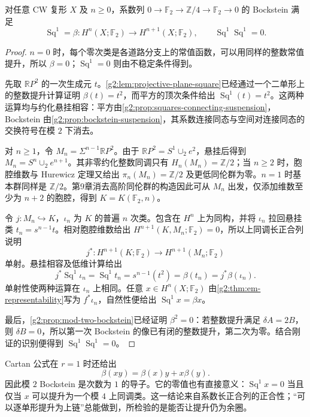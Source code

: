 \begin{proposition}\label{g2:prop:sq-one-bockstein}
	对任意 CW 复形 \(X\) 及 \(n\ge0\)，系数列 \(0\to\mathbb F_2\to\mathbb Z/4\to\mathbb F_2\to0\) 的 Bockstein 满足
	\[
		\operatorname{Sq}^1=\beta:H^n(X;\mathbb F_2)\longrightarrow H^{n+1}(X;\mathbb F_2),
		\qquad \operatorname{Sq}^1\operatorname{Sq}^1=0.
	\]
\end{proposition}
\begin{proof}
	\(n=0\) 时，每个零次类是各道路分支上的常值函数，可以用同样的整数常值提升，所以 \(\beta=0\)；\(\operatorname{Sq}^1=0\) 则由不稳定条件得到。

	先取 \(\mathbb RP^2\) 的一次生成元 \(t\)。\cref{g2:lem:projective-plane-square}已经通过一个二单形上的整数提升计算证明 \(\beta(t)=t^2\)，而平方的顶次条件给出 \(\operatorname{Sq}^1(t)=t^2\)。这两种运算均与约化悬挂相容：平方由\cref{g2:prop:squares-connecting-suspension}，Bockstein 由\cref{g2:prop:bockstein-suspension}，其系数连接同态与空间对连接同态的交换符号在模 \(2\) 下消去。

	对 \(n\ge1\)，令 \(M_n=\Sigma^{n-1}\mathbb RP^2\)。由于 \(\mathbb RP^2=S^1\cup_2 e^2\)，悬挂后得到 \(M_n=S^n\cup_2 e^{n+1}\)。其非零约化整数同调只有 \(H_n(M_n)=\mathbb Z/2\)；当 \(n\ge2\) 时，胞腔维数与 Hurewicz 定理又给出 \(\pi_n(M_n)=\mathbb Z/2\) 及更低同伦群为零。\(n=1\) 时基本群同样是 \(\mathbb Z/2\)。第9章消去高阶同伦群的构造因此可从 \(M_n\) 出发，仅添加维数至少为 \(n+2\) 的胞腔，得到 \(K=K(\mathbb F_2,n)\)。

	令 \(j:M_n\hookrightarrow K\)，\(\iota_n\) 为 \(K\) 的普遍 \(n\) 次类。包含在 \(H^n\) 上为同构，并将 \(\iota_n\) 拉回悬挂类 \(t_n=s^{n-1}t\)。相对胞腔维数给出 \(H^{n+1}(K,M_n;\mathbb F_2)=0\)，所以上同调长正合列说明
	\[
		j^*:H^{n+1}(K;\mathbb F_2)\longrightarrow H^{n+1}(M_n;\mathbb F_2)
	\]
	单射。悬挂相容及低维计算给出
	\[
		j^*\operatorname{Sq}^1\iota_n=\operatorname{Sq}^1t_n
		=s^{n-1}(t^2)=\beta(t_n)=j^*\beta(\iota_n).
	\]
	单射性使两种运算在 \(\iota_n\) 上相同。任意 \(x\in H^n(X;\mathbb F_2)\) 由\cref{g2:thm:em-representability}写为 \(f^*\iota_n\)，自然性便给出 \(\operatorname{Sq}^1x=\beta x\)。

	最后，\cref{g2:prop:mod-two-bockstein}已经证明 \(\beta^2=0\)：若整数提升满足 \(\delta A=2B\)，则 \(\delta B=0\)，所以第一次 Bockstein 的像已有闭的整数提升，第二次为零。结合刚证的识别便得到 \(\operatorname{Sq}^1\operatorname{Sq}^1=0\)。
\end{proof}

Cartan 公式在 \(r=1\) 时还给出
\[
	\beta(xy)=\beta(x)y+x\beta(y).
\]
因此模 \(2\) Bockstein 是次数为 \(1\) 的导子。它的零值也有直接意义：\(\operatorname{Sq}^1x=0\) 当且仅当 \(x\) 可以提升为一个模 \(4\) 上同调类。这一结论来自系数长正合列的正合性；“可以逐单形提升为上链”总能做到，所检验的是能否让提升仍为余圈。

